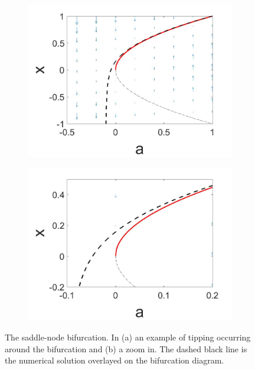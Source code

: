 \begin{figure}[H]
\centering
\begin{subfigure}{.5\textwidth}
 \centering
 \includegraphics[width=\linewidth]{intro/saddlenode_tipping.jpg}
 \caption{}
\end{subfigure}%
\begin{subfigure}{.5\textwidth}
 \centering
 \includegraphics[width=\linewidth]{intro/saddlenode_tipping_zoom.jpg}
 \caption{}
\end{subfigure}
\caption{The saddle-node bifurcation. In (a) an example of tipping occurring around the bifurcation and (b) a zoom in. The dashed black line is the numerical solution overlayed on the bifurcation diagram.}
\label{fig:intro_tipping}
\end{figure}


